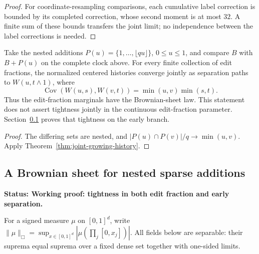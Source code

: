 \documentclass[11pt,letterpaper]{article}
\newcommand{\status}[1]{\textbf{Status: #1.}}
\begin{document}
\begin{proof}
For coordinate-resampling comparisons, each cumulative
label correction is bounded by its completed correction,
whose second moment is at most $32$.
A finite sum of these bounds transfers the joint limit;
no independence between the label corrections is needed.
\end{proof}

\begin{corollary}
\label{cor:edit-fraction-sheet-marginals}
Take the nested additions
$P(u)=\{1,\ldots,\lfloor qu\rfloor\}$, $0\le u\le1$,
and compare $B$ with $B+P(u)$ on the complete clock above.
For every finite collection of edit fractions, the normalized
centered histories converge jointly as separation paths to
$W(u,t\wedge1)$, where
\[
 \operatorname{Cov}(W(u,s),W(v,t))
                   =\min(u,v)\min(s,t).
\]
Thus the edit-fraction marginals have the Brownian-sheet law.
This statement does not assert tightness jointly in the
continuous edit-fraction parameter.
Section~\ref{sec:early-history-sheet} proves that tightness
on the early branch.
\end{corollary}
\begin{proof}
The differing sets are nested, and
$|P(u)\cap P(v)|/q\to\min(u,v)$.
Apply Theorem~\ref{thm:joint-growing-history}.
\end{proof}

\subsection{A Brownian sheet for nested sparse additions}
\label{sec:early-history-sheet}

\status{Working proof: tightness in both edit fraction and early separation}

For a signed measure $\mu$ on $[0,1]^d$, write
$\|\mu\|_\Box=\sup_{x\in[0,1]^d}|\mu(\prod_j[0,x_j])|$.
All fields below are separable: their suprema equal suprema
over a fixed dense set together with one-sided limits.
\end{document}
